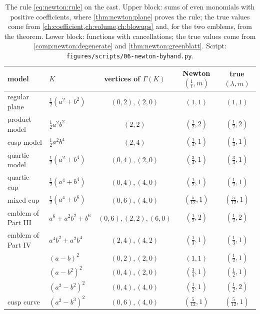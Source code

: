 \begin{refsection}
\begin{table}[t]
\centering\small
\setlength{\tabcolsep}{4pt}
\begin{tabular}{@{}llccc@{}}
\toprule
model & $K$ & vertices of $\Gamma(K)$ & Newton $(\frac1t,m)$ & true $(\lambda,m)$\\
\midrule
regular plane & $\frac12(a^2+b^2)$ & $(0,2),(2,0)$ & $(1,1)$ & $(1,1)$\\
product model & $\frac12a^2b^2$ & $(2,2)$ & $(\frac12,2)$ & $(\frac12,2)$\\
cusp model & $\frac12a^2b^4$ & $(2,4)$ & $(\frac14,1)$ & $(\frac14,1)$\\
quartic model & $\frac12(a^2+b^4)$ & $(0,4),(2,0)$ & $(\frac34,1)$ & $(\frac34,1)$\\
quartic cup & $\frac12(a^4+b^4)$ & $(0,4),(4,0)$ & $(\frac12,1)$ & $(\frac12,1)$\\
mixed cup & $\frac12(a^4+b^6)$ & $(0,6),(4,0)$ & $(\frac5{12},1)$ & $(\frac5{12},1)$\\
emblem of Part III & $a^6+a^2b^2+b^6$ & $(0,6),(2,2),(6,0)$ & $(\frac12,2)$ & $(\frac12,2)$\\
emblem of Part IV & $a^4b^2+a^2b^4$ & $(2,4),(4,2)$ & $(\frac13,1)$ & $(\frac13,1)$\\
\midrule
& $(a-b)^2$ & $(0,2),(2,0)$ & $(1,1)$ & $(\frac12,1)$\\
& $(a-b^2)^2$ & $(0,4),(2,0)$ & $(\frac34,1)$ & $(\frac12,1)$\\
& $(a^2-b^2)^2$ & $(0,4),(4,0)$ & $(\frac12,1)$ & $(\frac12,2)$\\
cusp curve & $(a^2-b^3)^2$ & $(0,6),(4,0)$ & $(\frac5{12},1)$ & $(\frac5{12},1)$\\
\bottomrule
\end{tabular}
\caption{The rule \eqref{eq:newton:rule} on the cast. Upper block: sums of even monomials with positive coefficients, where \cref{thm:newton:plane} proves the rule; the true values come from \cref{ch:coefficient,ch:volume,ch:blowups} and, for the two emblems, from the theorem. Lower block: functions with cancellations; the true values come from \cref{comp:newton:degenerate} and \cref{thm:newton:greenblatt}. Script: \texttt{figures/scripts/06-newton-byhand.py}.}\label{tab:newton:cast}
\end{table}


\end{refsection}
